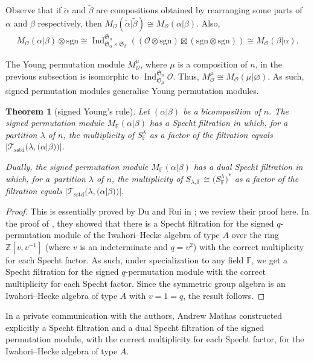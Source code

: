 \documentclass[pdftex]{sigma}
\newtheorem{Theorem}{Theorem}[section]
\newcommand{\TTS}{\mathscr{T}_\mathrm{sstd}}
\newcommand{\sgn}{\mathrm{sgn}}
\newcommand{\sym}[1]{\mathfrak{S}_{#1}}
\newcommand{\Ind}{\operatorname{\mathrm{Ind}}}
\newcommand{\F}{\mathbb{F}}
\renewcommand{\O}{\mathcal{O}}
\begin{document}
Observe that if $\tilde{\alpha}$ and $\tilde{\beta}$ are compositions obtained by rearranging some parts of $\alpha$ and $\beta$ respectively, then $M_\O(\tilde{\alpha}|\tilde{\beta}) \cong M_\O(\alpha|\beta)$. Also,
\begin{gather*}
M_\O(\alpha|\beta)\otimes \sgn \cong \Ind_{\sym{\alpha}\times \sym{\beta}}^{\sym{n}}((\O\otimes\sgn)\boxtimes (\sgn\otimes \sgn))\cong M_\O(\beta|\alpha).
\end{gather*}

The Young permutation module $M^{\mu}_\O$, where $\mu$ is a composition of $n$, in the previous subsection is isomorphic to $\Ind_{\sym{\mu}}^{\sym{n}} \O$. Thus, $M^{\mu}_\O \cong M_\O(\mu|\varnothing)$. As such, signed permutation modules generalise Young permutation modules.

\begin{Theorem}[signed Young's rule]\label{T:Specht factors of sgn permutation}
Let $(\alpha|\beta)$ be a bicomposition of $n$. The signed permutation module $M_\F(\alpha|\beta)$ has a Specht filtration in which, for a partition $\lambda$ of $n$, the multiplicity of $S_\F^\lambda$ as a factor of the filtration equals $|\TTS(\lambda, (\alpha|\beta))|$.

Dually, the signed permutation module $M_\F(\alpha|\beta)$ has a dual Specht filtration in which, for a~partition $\lambda$ of $n$, the multiplicity of $S_{\lambda,\F}\cong \big(S^\lambda_\F\big)^*$ as a factor of the filtration equals \linebreak $|\TTS(\lambda, (\alpha|\beta))|$.
\end{Theorem}

\begin{proof}This is essentially proved by Du and Rui in \cite{DR}; we review their proof here. In the proof of \cite[Proposition 5.2]{DR}, they showed that there is a Specht filtration for the signed $q$-permutation module of the Iwahori--Hecke algebra of type $A$ over the ring $\mathbb{Z}[v,v^{-1}]$ (where $v$ is an indeterminate and $q = v^2$) with the correct multiplicity for each Specht factor. As such, under specialization to any field $\F$, we get a Specht filtration for the signed $q$-permutation module with the correct multiplicity for each Specht factor. Since the symmetric group algebra is an Iwahori--Hecke algebra of type $A$ with $v=1=q$, the result follows.
\end{proof}

\begin{Remark}
In a private communication with the authors, Andrew Mathas constructed explicitly a Specht filtration and a dual Specht filtration of the signed permutation module, with the correct multiplicity for each Specht factor, for the Iwahori--Hecke algebra of type $A$.
\end{Remark}
\end{document}
